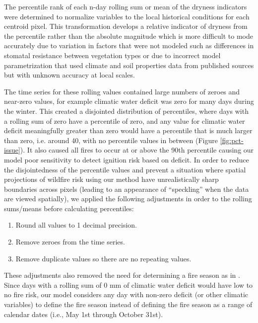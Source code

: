 \documentclass[11p]{article}
\begin{document}
The percentile rank of each n-day rolling sum or mean of the dryness indicators were determined to normalize variables to the local historical conditions for each centroid pixel. This transformation develops a relative indicator of dryness from the percentile rather than the absolute magnitude which is more difficult to mode accurately due to variation in factors that were not modeled such as differences in stomatal resistance between vegetation types or due to incorrect model parametrization that used climate and soil properties data from published sources but with unknown accuracy at local scales.

The time series for these rolling values contained large numbers of zeroes and near-zero values, for example climatic water deficit was zero for many days during the winter. This created a disjointed distribution of percentiles, where days with a rolling sum of zero have a percentile of zero, and any value for climatic water deficit meaningfully greater than zero would have a percentile that is much larger than zero, i.e. around 40, with no percentile values in between (Figure \ref{fig:pct-issue}). It also caused all fires to occur at or above the 90th percentile causing our model poor sensitivity to detect ignition risk based on deficit. In order to reduce the disjointedness of the percentile values and prevent a situation where spatial projections of wildfire risk using our method have unrealistically sharp boundaries across pixels (leading to an appearance of ``speckling'' when the data are viewed spatially), we applied the following adjustments in order to the rolling sums/means before calculating percentiles:

\begin{enumerate}
\item Round all values to 1 decimal precision.
\item Remove zeroes from the time series.
\item Remove duplicate values so there are no repeating values.
\end{enumerate}
   
These adjustments %
also removed the need for determining a fire season as in \citet{thomaWaterBalanceIndicator2020}. Since days with a rolling sum of 0 mm of climatic water deficit would have low to no fire risk, our model considers any day with non-zero deficit (or other climatic variables) to define the fire season instead of defining the fire season as a range of calendar dates (i.e., May 1st through October 31st).
\end{document}
